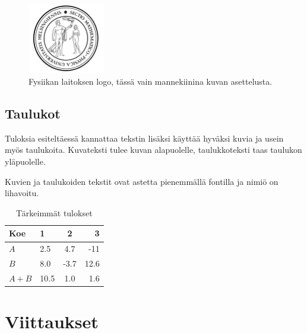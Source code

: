 \documentclass[finnish,twoside,openright,utf]{HYgradu}
\begin{document}
\begin{figure}[h!] 
\centering %
\includegraphics[width=0.3\textwidth]{sinetti.png}
\caption{Fysiikan laitoksen logo, tässä vain mannekiinina kuvan asettelusta.}
\label{fig:sinetti}
\end{figure}

\section{Taulukot}

Tuloksia esiteltäessä kannattaa tekstin lisäksi käyttää hyväksi kuvia ja usein myös taulukoita. Kuvateksti tulee kuvan alapuolelle, taulukkoteksti taas taulukon  yläpuolelle.

Kuvien ja taulukoiden tekstit ovat astetta pienemmällä fontilla ja nimiö on lihavoitu.

\begin{table}
\centering
\caption{Tärkeimmät tulokset}
\label{tab:symbols}
\begin{tabular}{l||l c r} %
Koe & 1 & 2 & 3 \\ 
\hline \hline %
$A$ & 2.5 & 4.7 & -11 \\
$B$ & 8.0 & -3.7 & 12.6 \\
$A+B$ & 10.5 & 1.0 & 1.6 \\
\hline
%
\end{tabular}
\end{table}

\chapter{Viittaukset}
\end{document}
